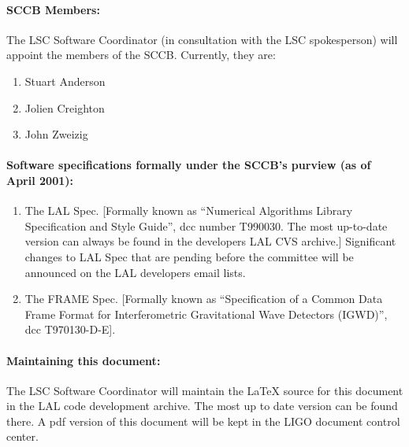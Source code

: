 \documentclass[]{ligodcc}
\begin{document}
\paragraph*{SCCB Members: \\}

The LSC Software Coordinator (in consultation with the LSC
spokesperson) will appoint the members of the SCCB. Currently, they
are:
\begin{enumerate}
\item
\vskip -0.1in
Stuart Anderson
\item
Jolien Creighton
\item
John Zweizig
\end{enumerate}

\paragraph*{Software specifications formally under the SCCB's purview
(as of April 2001):\\}
\begin{enumerate}
\item
\vskip -0.3in
The LAL Spec. [Formally known as ``Numerical Algorithms Library
Specification and Style Guide'', dcc number T990030. The most up-to-date
version can always be found in the developers LAL CVS archive.]
Significant changes to LAL Spec that are pending before the committee
will be announced on the LAL developers email lists.
\item
The FRAME Spec. [Formally known as ``Specification of a Common Data
Frame Format for Interferometric Gravitational Wave Detectors (IGWD)'',
dcc T970130-D-E]. 
\end{enumerate}

\paragraph*{Maintaining this document:\\}
The LSC Software Coordinator will maintain the LaTeX source for this
document in the LAL code development archive.  The most up to date
version can be found there.  A pdf version of this document will be
kept in the LIGO document control center.
\end{document}
